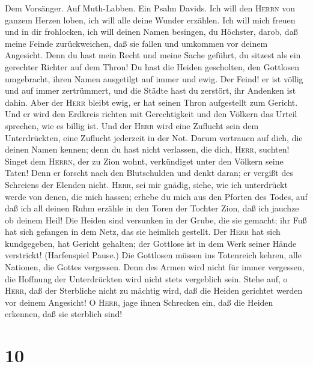  Dem Vorsänger. Auf Muth-Labben. Ein Psalm Davids. Ich
will den \textsc{Herrn} von ganzem Herzen loben, ich will alle deine
Wunder erzählen.  Ich will mich freuen und in dir
frohlocken, ich will deinen Namen besingen, du Höchster, 
darob, daß meine Feinde zurückweichen, daß sie fallen und umkommen vor
deinem Angesicht.  Denn du hast mein Recht und meine Sache
geführt, du sitzest als ein gerechter Richter auf dem Thron!
 Du hast die Heiden gescholten, den Gottlosen umgebracht,
ihren Namen ausgetilgt auf immer und ewig.  Der Feind! er
ist völlig und auf immer zertrümmert, und die Städte hast du zerstört,
ihr Andenken ist dahin.  Aber der \textsc{Herr} bleibt
ewig, er hat seinen Thron aufgestellt zum Gericht.  Und er
wird den Erdkreis richten mit Gerechtigkeit und den Völkern das Urteil
sprechen, wie es billig ist.  Und der \textsc{Herr} wird
eine Zuflucht sein dem Unterdrückten, eine Zuflucht jederzeit in der
Not.  Darum vertrauen auf dich, die deinen Namen kennen;
denn du hast nicht verlassen, die dich, \textsc{Herr}, suchten!
 Singet dem \textsc{Herrn}, der zu Zion wohnt,
verkündiget unter den Völkern seine Taten!  Denn er
forscht nach den Blutschulden und denkt daran; er vergißt des Schreiens
der Elenden nicht.  \textsc{Herr}, sei mir gnädig, siehe,
wie ich unterdrückt werde von denen, die mich hassen; erhebe du mich aus
den Pforten des Todes,  auf daß ich all deinen Ruhm
erzähle in den Toren der Tochter Zion, daß ich jauchze ob deinem Heil!
 Die Heiden sind versunken in der Grube, die sie gemacht;
ihr Fuß hat sich gefangen in dem Netz, das sie heimlich gestellt.
 Der \textsc{Herr} hat sich kundgegeben, hat Gericht
gehalten; der Gottlose ist in dem Werk seiner Hände verstrickt!
(Harfenspiel Pause.)  Die Gottlosen müssen ins Totenreich
kehren, alle Nationen, die Gottes vergessen.  Denn des
Armen wird nicht für immer vergessen, die Hoffnung der Unterdrückten
wird nicht stets vergeblich sein.  Stehe auf, o
\textsc{Herr}, daß der Sterbliche nicht zu mächtig wird, daß die Heiden
gerichtet werden vor deinem Angesicht!  O \textsc{Herr},
jage ihnen Schrecken ein, daß die Heiden erkennen, daß sie sterblich
sind!

\hypertarget{section-9}{%
\section{10}\label{section-9}}

